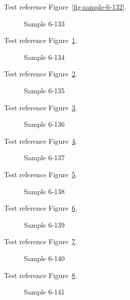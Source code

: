 Test reference Figure~\ref{fig:sample-6-132}.

\begin{figure}[tbhp]
\caption{Sample 6-133}
\label{fig:sample-6-133}
\end{figure}

Test reference Figure~\ref{fig:sample-6-133}.

\begin{figure}[tbhp]
\caption{Sample 6-134}
\label{fig:sample-6-134}
\end{figure}

Test reference Figure~\ref{fig:sample-6-134}.

\begin{figure}[tbhp]
\caption{Sample 6-135}
\label{fig:sample-6-135}
\end{figure}

Test reference Figure~\ref{fig:sample-6-135}.

\begin{figure}[tbhp]
\caption{Sample 6-136}
\label{fig:sample-6-136}
\end{figure}

Test reference Figure~\ref{fig:sample-6-136}.

\begin{figure}[tbhp]
\caption{Sample 6-137}
\label{fig:sample-6-137}
\end{figure}

Test reference Figure~\ref{fig:sample-6-137}.

\begin{figure}[tbhp]
\caption{Sample 6-138}
\label{fig:sample-6-138}
\end{figure}

Test reference Figure~\ref{fig:sample-6-138}.

\begin{figure}[tbhp]
\caption{Sample 6-139}
\label{fig:sample-6-139}
\end{figure}

Test reference Figure~\ref{fig:sample-6-139}.

\begin{figure}[tbhp]
\caption{Sample 6-140}
\label{fig:sample-6-140}
\end{figure}

Test reference Figure~\ref{fig:sample-6-140}.

\begin{figure}[tbhp]
\caption{Sample 6-141}
\label{fig:sample-6-141}
\end{figure}

